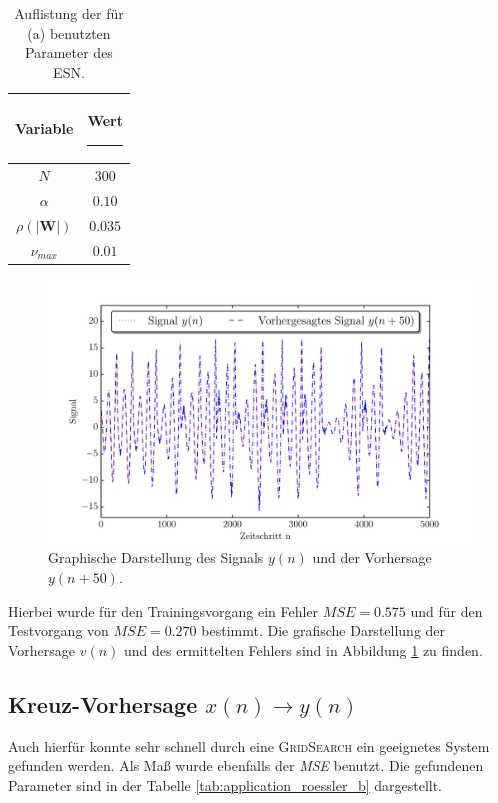 \begin{table}[H]
	\centering
		\begin{tabular}{|c|c|}
		\rule[-1ex]{0pt}{3.5ex} Variable & \hspace{4ex} Wert \rule[-1ex]{4ex}{0pt}\\ 
		\hline \hline 
		\rule[-1ex]{0pt}{3.5ex} $N$ & $300$ \\ 
		\hline 
		\rule[-1ex]{0pt}{3.5ex} $\alpha$ & $0.10$ \\ 
		\hline 
		\rule[-1ex]{0pt}{3.5ex} $\rho(|\mathbf{W}|)$ & $0.035$ \\ 
		\hline 
		\rule[-1ex]{0pt}{3.5ex} $\nu_{max}$ & $0.01$ \\ 
		\hline 
	\end{tabular} 
	\caption{Auflistung der für (a) benutzten Parameter des \textsc{ESN}.}
\label{tab:application_roessler_a}
\end{table}
\begin{figure}[H]
    \centering
    \includegraphics[width = 0.9 \textwidth]{figures/roessler_pred50.pdf}
    \caption{Graphische Darstellung des Signals $y(n)$ und der Vorhersage $y(n+50)$.}
    \label{fig:application_roessler_a}
\end{figure}

Hierbei wurde für den Trainingsvorgang ein Fehler $MSE = 0.575$ und für den Testvorgang von $MSE = 0.270$ bestimmt. Die grafische Darstellung der Vorhersage $v(n)$ und des ermittelten Fehlers sind in Abbildung \ref{fig:application_roessler_a} zu finden.

\subsection{Kreuz-Vorhersage $x(n) \rightarrow y(n)$}
Auch hierfür konnte sehr schnell durch eine \textsc{GridSearch} ein geeignetes System gefunden werden. Als Maß wurde ebenfalls der \textit{MSE} benutzt. Die gefundenen Parameter sind in der Tabelle \ref{tab:application_roessler_b} dargestellt.

